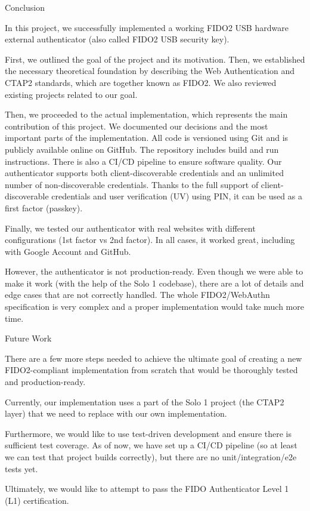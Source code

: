 \chap[conclusion] Conclusion

In this project, {\sbf we successfully implemented} a working FIDO2 USB hardware external authenticator (also called FIDO2 USB security key).

First, we outlined the goal of the project and its motivation. Then, we established the necessary theoretical foundation by describing the Web Authentication and CTAP2 standards, which are together known as FIDO2. We also reviewed existing projects related to our goal.

Then, we proceeded to the actual implementation, which represents the main contribution of this project.
We documented our decisions and the most important parts of the implementation. All code is versioned using Git and is publicly {\sbf available online on GitHub}. The repository includes build and run instructions. There is also a {\sbf CI/CD pipeline} to ensure software quality. Our authenticator supports both client-discoverable credentials and an unlimited number of non-discoverable credentials. Thanks to the full support of client-discoverable credentials and user verification (UV) using PIN, it can be used as a first factor (passkey).

Finally, {\sbf we tested} our authenticator {\sbf with real websites} with different configurations (1st factor vs 2nd factor). In all cases, {\sbf it worked great}, including with Google Account and GitHub.

However, the authenticator is not production-ready. Even though we were able to make it work (with the help of the Solo 1 codebase), there are a lot of details and edge cases that are not correctly handled. The whole FIDO2/WebAuthn specification is very complex and a proper implementation would take much more time.


\sec Future Work

There are a few more steps needed to achieve the ultimate goal of creating a new FIDO2-compliant implementation from scratch that would be thoroughly tested and production-ready.

Currently, our implementation uses a part of the Solo 1 project (the CTAP2 layer) that we need to replace with our own implementation.

Furthermore, we would like to use test-driven development and ensure there is sufficient test coverage. As of now, we have set up a CI/CD pipeline (so at least we can test that project builds correctly), but there are no unit/integration/e2e tests yet.

Ultimately, we would like to attempt to pass the FIDO Authenticator Level 1 (L1) certification.
